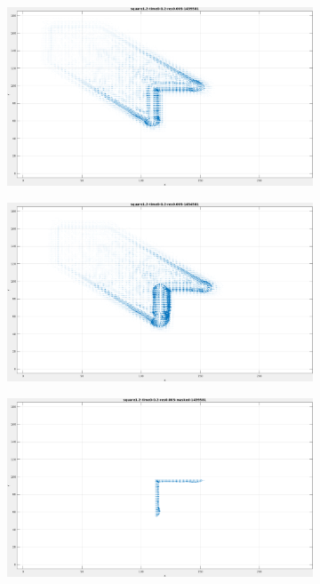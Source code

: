 \begin{appendix}
\begin{figure}[tb]
\centering
\begin{subfigure}{.45\textwidth}
  \centering
  \includegraphics[height=.6\linewidth]{figs/square12/square12-1.png}
  \caption{}
\end{subfigure}
\begin{subfigure}{.45\textwidth}
  \centering
  \includegraphics[height=.6\linewidth]{figs/square12/square12-2.png}
  \caption{}
\end{subfigure}
\begin{subfigure}{.45\textwidth}
  \includegraphics[height=.6\linewidth]{figs/square12/square12-masked-1.png}

\end{subfigure}
\end{figure}
\end{appendix}
